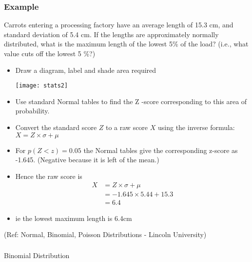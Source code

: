 \begin{frame}
\frametitle{Example}
Carrots entering a processing factory have an average length of 15.3 cm, and
standard deviation of 5.4 cm. If the lengths are approximately normally distributed,
what is the maximum length of the lowest 5\% of the load?
(i.e., what value cuts off the lowest 5 \%?)
\begin{itemize}
\item Draw a diagram, label and shade area required

\begin{center}
\texttt{[image: stats2]}
\end{center}

\item Use standard Normal tables to find the Z -score corresponding to this area of probability. 
\item Convert the standard score $Z$ to a raw score $X$ using the inverse formula: $X = Z \times \sigma + \mu$
\item For $p(Z < z) = 0.05$ the Normal tables give the corresponding z-score as -1.645.
(Negative because it is left of the mean.)
\item Hence the raw score is 
\begin{align*}
X &= Z \times \sigma + \mu\\
&= -1.645 \times 5.44 + 15.3\\
&=6.4
\end{align*}
\item ie the lowest maximum length is 6.4cm
\end{itemize}


{\tiny (Ref: Normal, Binomial, Poisson Distributions -  Lincoln University)}
\end{frame}

\begin{frame}[fragile]\frametitle{}
\begin{center}
{\Large Binomial Distribution}
\end{center}
\end{frame}

